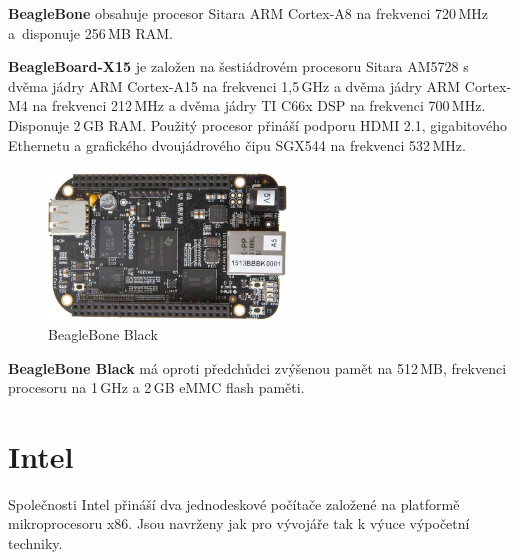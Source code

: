 \textbf{BeagleBone} obsahuje procesor Sitara ARM Cortex-A8 na frekvenci 720\,MHz a~disponuje 256\,MB RAM.

\textbf{BeagleBoard-X15} je založen na šestiádrovém procesoru Sitara AM5728 s dvěma jádry ARM Cortex-A15 na frekvenci 1,5\,GHz a dvěma jádry ARM Cortex-M4 na frekvenci 212\,MHz a dvěma jádry TI C66x DSP na frekvenci 700\,MHz. Disponuje 2\,GB RAM. Použitý procesor přináší podporu HDMI 2.1, gigabitového Ethernetu a grafického dvoujádrového čipu SGX544 na frekvenci 532\,MHz. 

	\begin{figure}[!ht]
  \begin{center}
    \includegraphics[height=4cm]{obrazky/embed_beaglebone_black}
  \end{center}
	\vspace{-20pt}
  \caption{BeagleBone Black~\cite{BeagleBone}}
\end{figure}

\textbf{BeagleBone Black} má oproti předchůdci zvýšenou pamět na 512\,MB, frekvenci procesoru na 1\,GHz a 2\,GB eMMC flash paměti.


\section{Intel}
\label{KapIntel}

Společnosti Intel přináší dva jednodeskové počítače založené na platformě mikroprocesoru x86. Jsou navrženy jak pro vývojáře tak k výuce výpočetní techniky.

